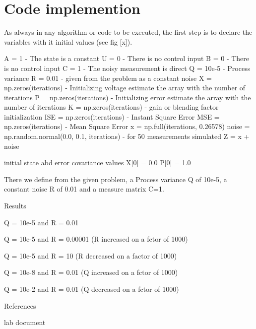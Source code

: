 \documentclass{article}
\begin{document}
    \section{Code implemention}
        
    As always in any algorithm or code  to be executed, the first step is to declare the variables with it initial values (see fig [x]).

    A = 1 - The state is a constant
    U = 0 - There is no control input
    B = 0 - There is no control input
    C = 1 - The noisy measurement is direct
    Q = 10e-5 - Process variance
    R = 0.01 - given from the problem as a constant noise
    X = np.zeros(iterations)  - Initializing voltage estimate the array with the number of iterations 
    P = np.zeros(iterations) - Initializing error estimate the array with the number of iterations
    K = np.zeros(iterations) - gain or blending factor initialization
    ISE = np.zeros(iterations) - Instant Square Error
    MSE = np.zeros(iterations) - Mean Square Error
    x = np.full(iterations, 0.26578)
    noise = np.random.normal(0.0, 0.1, iterations) - for 50 measurements simulated
    Z = x + noise

    initial state abd error covariance values
    X[0] = 0.0
    P[0] = 1.0

    There we define from the given problem, a Process variance Q of 10e-5, a constant noise R of 0.01 and a measure matrix C=1.

    Results

    Q = 10e-5 and R = 0.01

    Q = 10e-5 and R = 0.00001 (R increased on a fctor of 1000)

    Q = 10e-5 and R = 10 (R decreased on a factor of 1000)

    Q = 10e-8 and R = 0.01 (Q increased on a fctor of 1000)

    Q = 10e-2 and R = 0.01 (Q decreased on a fctor of 1000)

    References

    lab document
\end{document}
